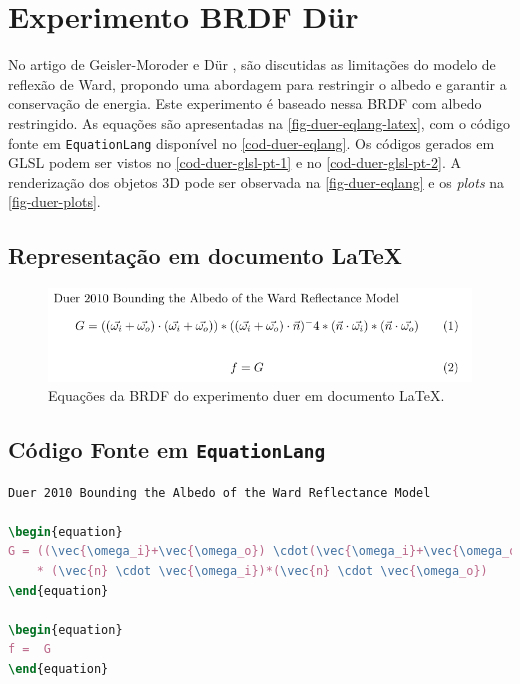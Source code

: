 \section{Experimento BRDF Dür}

No artigo de Geisler-Moroder e Dür \cite{duer2010bounding}, são discutidas as limitações do modelo de reflexão de Ward, propondo uma abordagem para restringir o albedo e garantir a conservação de energia. Este experimento é baseado nessa BRDF com albedo restringido. As equações são apresentadas na \autoref{fig-duer-eqlang-latex}, com o código fonte em \texttt{EquationLang} disponível no \autoref{cod-duer-eqlang}. Os códigos gerados em GLSL podem ser vistos no \autoref{cod-duer-glsl-pt-1} e no \autoref{cod-duer-glsl-pt-2}. A renderização dos objetos 3D pode ser observada na \autoref{fig-duer-eqlang} e os \textit{plots} na \autoref{fig-duer-plots}.

\subsection{Representação em documento \LaTeX{}}
\begin{figure}[H]
    \caption{\label{fig-duer-eqlang-latex} \small Equações da BRDF do experimento duer em documento \LaTeX{}.}
    \begin{center}
        \includegraphics[scale=0.92]{./Imagens/brdfs/duer.pdf}
    \end{center}
\end{figure}

\subsection{Código Fonte em \texttt{EquationLang}}
\begin{codigo}[H]
    \caption{\small Código fonte da BRDF deste experimento.}
    \label{cod-duer-eqlang}
\begin{lstlisting}[language=tex, frame=none, inputencoding=utf8]
Duer 2010 Bounding the Albedo of the Ward Reflectance Model

\begin{equation}
G = ((\vec{\omega_i}+\vec{\omega_o}) \cdot(\vec{\omega_i}+\vec{\omega_o})) * ((\vec{\omega_i}+\vec{\omega_o}) \cdot \vec{n})^-4
    * (\vec{n} \cdot \vec{\omega_i})*(\vec{n} \cdot \vec{\omega_o})
\end{equation}

\begin{equation}
f =  G
\end{equation}
\end{lstlisting}
\end{codigo}

